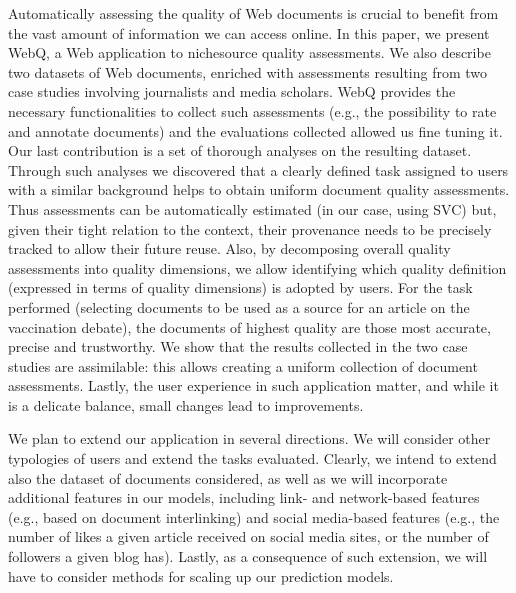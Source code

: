 \documentclass{llncs}
\begin{document}
Automatically assessing the quality of Web documents is crucial to benefit from the vast amount of information we can access online. In this paper, we present WebQ, a Web application to nichesource quality assessments. We also describe two datasets of Web documents, enriched with assessments resulting from two case studies involving journalists and media scholars. WebQ provides the necessary functionalities to collect such assessments (e.g., the possibility to rate and annotate documents) and the evaluations collected allowed us fine tuning it. Our last contribution is a set of thorough analyses on the resulting dataset. Through such analyses we discovered that a clearly defined task assigned to users with a similar background helps to obtain uniform document quality assessments. Thus assessments can be automatically estimated (in our case, using SVC) but, given their tight relation to the context, their provenance needs to be precisely tracked to allow their future reuse. Also, by decomposing overall quality assessments into quality dimensions, we allow identifying which quality definition (expressed in terms of quality dimensions) is adopted by users. For the task performed (selecting documents to be used as a source for an article on the vaccination debate), the documents of highest quality are those most accurate, precise and trustworthy. We show that the results collected in the two case studies are assimilable: this allows creating a uniform collection of document assessments. Lastly, the user experience in such application matter, and while it is a delicate balance, small changes lead to improvements.
%
%
%
%
%

We plan to extend our application in several directions. We will consider other typologies of users and extend the tasks evaluated. Clearly, we intend to extend also the dataset of documents considered, as well as we will incorporate additional features in our models, including link- and network-based features (e.g., based on document interlinking) and social media-based features (e.g., the number of likes a given article received on social media sites, or the number of followers a given blog has). Lastly, as a consequence of such extension, we will have to consider methods for scaling up our prediction models.
\end{document}
